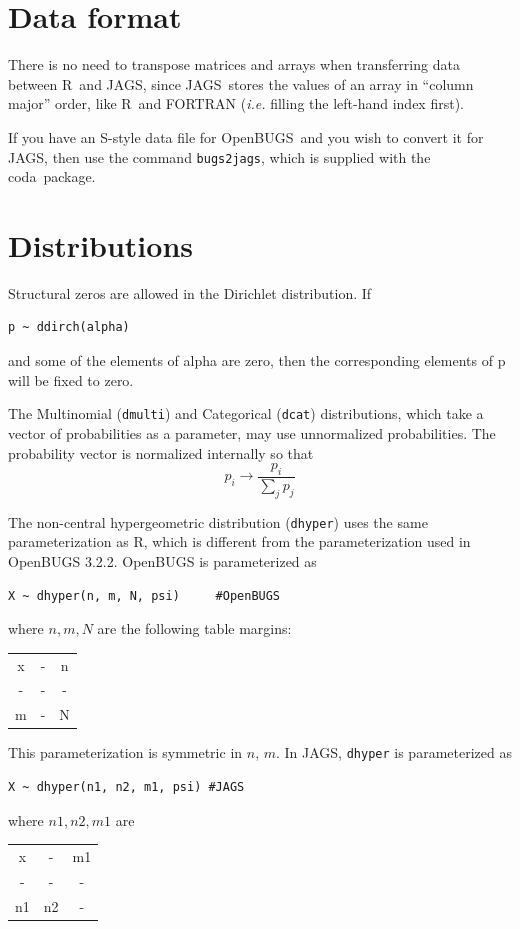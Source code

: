 \documentclass[11pt, a4paper, titlepage]{report}
\newcommand{\JAGS}{\textsf{JAGS}}
\newcommand{\OpenBUGS}{\textsf{OpenBUGS}}
\newcommand{\R}{\textsf{R}}
\newcommand{\CODA}{\textsf{coda}}
\begin{document}
{\section{Data format}

There is no need to transpose matrices and arrays when transferring
data between \R\ and \JAGS, since \JAGS\ stores the values of an array
in ``column major'' order, like \R\ and FORTRAN ({\em i.e.} filling
the left-hand index first).

If you have an \textsf{S}-style data file for \OpenBUGS\ and you wish
to convert it for \JAGS, then use the command \texttt{bugs2jags},
which is supplied with the \CODA\ package.

\section{Distributions}

Structural zeros are allowed in the Dirichlet distribution. If
\begin{verbatim}
p ~ ddirch(alpha)
\end{verbatim}
and some of the elements of alpha are zero, then the corresponding
elements of p will be fixed to zero.

The Multinomial (\verb+dmulti+) and Categorical (\verb+dcat+)
distributions, which take a vector of probabilities as a parameter,
may use unnormalized probabilities. The probability vector is
normalized internally so that
\[
p_i \rightarrow \frac{p_i}{\sum_j p_j}
\]

The non-central hypergeometric distribution (\verb+dhyper+) uses the
same parameterization as \R, which is different from the
parameterization used in OpenBUGS 3.2.2. OpenBUGS is parameterized as
\begin{verbatim}
X ~ dhyper(n, m, N, psi)     #OpenBUGS
\end{verbatim}
where $n, m, N$ are the following table margins:
\begin{center}
\begin{tabular}{|cc|c|}
\hline
x & - & n \\
-  & - & -  \\
\hline
m & - & N \\
\hline
\end{tabular}
\end{center}
This parameterization is symmetric in $n$, $m$. In JAGS, \verb+dhyper+
is parameterized as
\begin{verbatim}
X ~ dhyper(n1, n2, m1, psi) #JAGS 
\end{verbatim}
where $n1, n2, m1$ are
\begin{center}
\begin{tabular}{|cc|c|}
\hline
x & - & m1 \\
-  & - & -   \\
\hline
n1 & n2 & - \\
\hline
\end{tabular}
\end{center}

}
\end{document}
